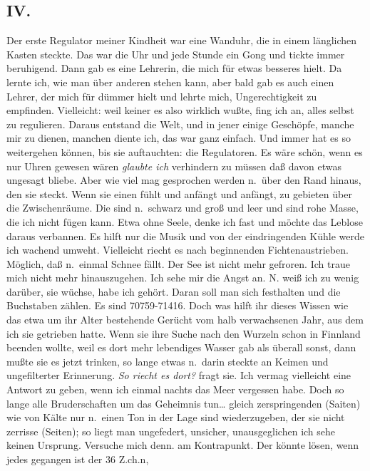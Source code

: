 \documentclass[
]{article}
\author{}
\date{\vspace{-2.5em}}
\begin{document}
\subsection{IV.}\label{iv.}

Der erste Regulator meiner Kindheit war eine Wanduhr, die in einem
länglichen Kasten steckte. Das war die Uhr und jede Stunde ein Gong und
tickte immer beruhigend. Dann gab es eine Lehrerin, die mich für etwas
besseres hielt. Da lernte ich, wie man über anderen stehen kann, aber
bald gab es auch einen Lehrer, der mich für dümmer hielt und lehrte
mich, Ungerechtigkeit zu empfinden. Vielleicht: weil keiner es also
wirklich wußte, fing ich an, alles selbst zu regulieren. Daraus entstand
die Welt, und in jener einige Geschöpfe, manche mir zu dienen, manchen
diente ich, das war ganz einfach. Und immer hat es so weitergehen
können, bis sie auftauchten: die Regulatoren. Es wäre schön, wenn es nur
Uhren gewesen wären \emph{glaubte ich }verhindern zu müssen daß davon
etwas ungesagt bliebe. Aber wie viel mag gesprochen werden n.~über den
Rand hinaus, den sie steckt. Wenn sie einen fühlt und anfängt und
anfängt, zu gebieten über die Zwischenräume. Die sind n.~schwarz und
groß und leer und sind rohe Masse, die ich nicht fügen kann. Etwa ohne
Seele, denke ich fast und möchte das Leblose daraus verbannen. Es hilft
nur die Musik und von der eindringenden Kühle werde ich wachend umweht.
Vielleicht riecht es nach beginnenden Fichtenaustrieben. Möglich, daß
n.~einmal Schnee fällt. Der See ist nicht mehr gefroren. Ich traue mich
nicht mehr hinauszugehen. Ich sehe mir die Angst an. N. weiß ich zu
wenig darüber, sie wüchse, habe ich gehört. Daran soll man sich
festhalten und die Buchstaben zählen. Es sind 70759-71416. Doch was
hilft ihr dieses Wissen wie das etwa um ihr Alter bestehende Gerücht vom
halb verwachsenen Jahr, aus dem ich sie getrieben hatte. Wenn sie ihre
Suche nach den Wurzeln schon in Finnland beenden wollte, weil es dort
mehr lebendiges Wasser gab als überall sonst, dann mußte sie es jetzt
trinken, so lange etwas n.~darin steckte an Keimen und ungefilterter
Erinnerung. \emph{So riecht es dort? }fragt sie. Ich vermag vielleicht
eine Antwort zu geben, wenn ich einmal nachts das Meer vergessen habe.
Doch so lange alle Bruderschaften um das Geheimnis tun\ldots{} gleich
zerspringenden (Saiten) wie von Kälte nur n.~einen Ton in der Lage sind
wiederzugeben, der sie nicht zerrisse (Seiten); so liegt man ungefedert,
unsicher, unausgeglichen ich sehe keinen Ursprung. Versuche mich denn.
am Kontrapunkt. Der könnte lösen, wenn jedes gegangen ist der 36 Z.ch.n,
\end{document}
